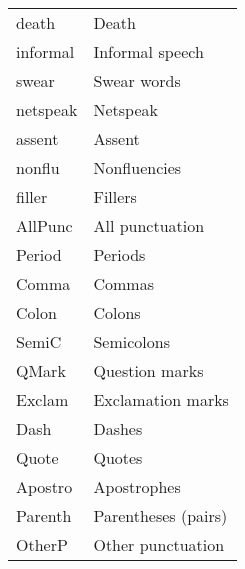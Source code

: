 \documentclass[../thesis.tex]{subfiles}
\begin{document}
\begin{longtable}[t]{ll}
death & Death\\
\addlinespace
informal & Informal speech\\
swear & Swear words\\
netspeak & Netspeak\\
assent & Assent\\
nonflu & Nonfluencies\\
\addlinespace
filler & Fillers\\
AllPunc & All punctuation\\
Period & Periods\\
Comma & Commas\\
Colon & Colons\\
\addlinespace
SemiC & Semicolons\\
QMark & Question marks\\
Exclam & Exclamation marks\\
Dash & Dashes\\
Quote & Quotes\\
\addlinespace
Apostro & Apostrophes\\
Parenth & Parentheses (pairs)\\
OtherP & Other punctuation\\
\bottomrule
\end{longtable}
\end{document}
